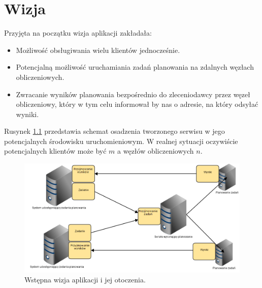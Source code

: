 \chapter{Wizja}

Przyjęta na początku wizja aplikacji zakładała:

\begin{itemize}
	\item Możliwość obsługiwania wielu klientów jednocześnie.
	\item Potencjalną możliwość uruchamiania zadań planowania na zdalnych węzłach obliczeniowych.
	\item Zwracanie wyników planowania bezpośrednio do zleceniodawcy przez węzeł obliczeniowy, który w tym celu informował by nas o adresie, na który odsyłać wyniki.
\end{itemize}

Rusynek \ref{fig:wizja} przedstawia schemat osadzenia tworzonego serwisu w jego potencjalnych środowisku uruchomieniowym.
W realnej sytuacji oczywiście potencjalnych klientów może być $m$ a węzłów obliczeniowych $n$.

\begin{figure}[!h]
	\centering
	\includegraphics[width=\linewidth]{img/wizja}
	\caption{Wstępna wizja aplikacji i jej otoczenia.}
	\label{fig:wizja}
\end{figure}
